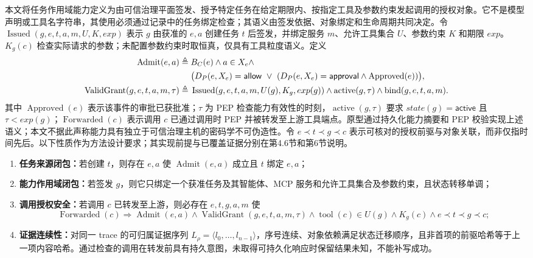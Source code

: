 本文将任务作用域能力定义为由可信治理平面签发、授予特定任务在给定期限内、按指定工具及参数约束发起调用的授权对象。它不是模型声明或工具名字符串，其使用必须通过记录中的任务绑定检查；其语义由签发依据、对象绑定和生命周期共同决定。令 $\operatorname{Issued}(g,e,t,a,m,U,K,exp)$ 表示 $g$ 由获准的 $e,a$ 创建任务 $t$ 后签发，并绑定服务 $m$、允许工具集合 $U$、参数约束 $K$ 和期限 $exp$。$K_g(c)$ 检查实际请求的参数；未配置参数约束时取恒真，仅具有工具粒度语义。定义
\begin{align}
\operatorname{Admit}(e,a) \triangleq {}& B_C(e)\land a\in X_e\land\\
&\bigl(D_P(e,X_e)=\mathsf{allow}\ \lor\
(D_P(e,X_e)=\mathsf{approval}\land\operatorname{Approved}(e))\bigr),\notag \\
\operatorname{ValidGrant}(g,e,t,a,m,\tau) \triangleq {}&
\operatorname{Issued}(g,e,t,a,m,U(g),K_g,exp(g))\land
\operatorname{active}(g,\tau)\land
\operatorname{bind}(g,e,t,a,m).
\label{eq:predicates-v11}
\end{align}
其中 $\operatorname{Approved}(e)$ 表示该事件的审批已获批准；$\tau$ 为 PEP 检查能力有效性的时刻，$\operatorname{active}(g,\tau)$ 要求 $state(g)=\mathsf{active}$ 且 $\tau<exp(g)$；$\operatorname{Forwarded}(c)$ 表示调用 $c$ 已通过调用时 PEP 并被转发至上游工具端点。原型通过持久化能力摘要和 PEP 校验实现上述语义；本文不据此声称能力具有独立于可信治理主机的密码学不可伪造性。令 $e\prec t\prec g\prec c$ 表示可核对的授权前驱与对象关联，而非仅指时间先后。以下性质作为方法设计要求；其实现前提与已覆盖证据分别在第4.6节和第6节说明。

\begin{enumerate}[label=I\arabic*.]
  \item \textbf{任务来源闭包：}若创建 $t$，则存在 $e,a$ 使 $\operatorname{Admit}(e,a)$ 成立且 $t$ 绑定 $e,a$；
  \item \textbf{能力作用域闭包：}若签发 $g$，则它只绑定一个获准任务及其智能体、MCP 服务和允许工具集合及参数约束，且状态转移单调；
  \item \textbf{调用授权安全：}若调用 $c$ 已转发至上游，则必存在 $e,t,g,a,m$ 使
  \begin{equation}
  \operatorname{Forwarded}(c)\Rightarrow
  \operatorname{Admit}(e,a)\land
  \operatorname{ValidGrant}(g,e,t,a,m,\tau)\land
  \operatorname{tool}(c)\in U(g)\land K_g(c)\land e\prec t\prec g\prec c;
  \label{eq:end-to-end-safety-v11}
  \end{equation}
  \item \textbf{证据连续性：}对同一 trace 的可归属证据序列 $L_\rho=\langle l_0,\ldots,l_{n-1}\rangle$，序号连续、对象依赖满足状态迁移顺序，且非首项的前驱哈希等于上一项内容哈希。通过检查的调用在转发前具有持久意图，未取得可持久化响应时保留结果未知，不能补写成功。
\end{enumerate}

